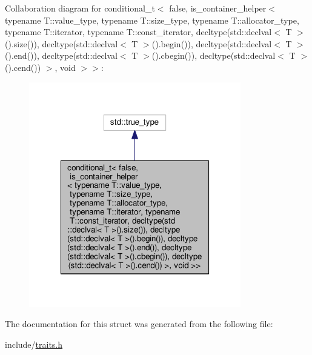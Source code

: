 Collaboration diagram for conditional\-\_\-t$<$ false, is\-\_\-container\-\_\-helper$<$ typename T\-:\-:value\-\_\-type, typename T\-:\-:size\-\_\-type, typename T\-:\-:allocator\-\_\-type, typename T\-:\-:iterator, typename T\-:\-:const\-\_\-iterator, decltype(std\-:\-:declval$<$ T $>$().size()), decltype(std\-:\-:declval$<$ T $>$().begin()), decltype(std\-:\-:declval$<$ T $>$().end()), decltype(std\-:\-:declval$<$ T $>$().cbegin()), decltype(std\-:\-:declval$<$ T $>$().cend()) $>$, void $>$$>$\-:
\nopagebreak
\begin{figure}[H]
\begin{center}
\leavevmode
\includegraphics[width=262pt]{structis__container_3_01_t_00_01std_1_1conditional__t_3_01false_00_01is__container__helper_3_01t6d3f177557a3c17216cc20edaf3f7e80}
\end{center}
\end{figure}


The documentation for this struct was generated from the following file\-:\begin{DoxyCompactItemize}
\item 
include/\hyperlink{traits_8h}{traits.\-h}\end{DoxyCompactItemize}
